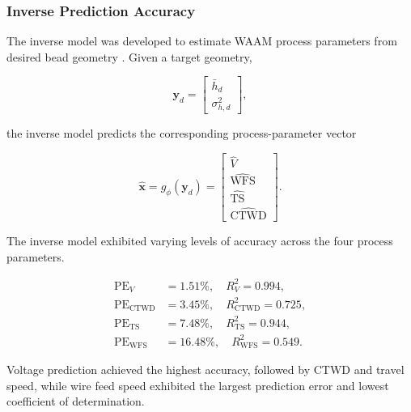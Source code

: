 \documentclass[11pt]{article}
\begin{document}
\subsubsection{Inverse Prediction Accuracy}

The inverse model was developed to estimate WAAM process parameters from desired bead geometry \cite{Karmuhilan2018,Xiong2014}. Given a target geometry,

\begin{equation}
\mathbf{y}_{d} =
\begin{bmatrix}
\bar{h}_{d} \\
\sigma_{h,d}^{2}
\end{bmatrix},
\end{equation}

the inverse model predicts the corresponding process-parameter vector

\begin{equation}
\hat{\mathbf{x}} =
g_{\phi}(\mathbf{y}_{d}) =
\begin{bmatrix}
\hat{V} \\
\widehat{\mathrm{WFS}} \\
\widehat{\mathrm{TS}} \\
\widehat{\mathrm{CTWD}}
\end{bmatrix}.
\end{equation}

The inverse model exhibited varying levels of accuracy across the four process parameters.

\begin{tcolorbox}[colback=white,colframe=black,boxrule=0.5pt,arc=2pt]
\small
\begin{equation}
\begin{aligned}
\mathrm{PE}_{V} &= 1.51\%, \quad R_{V}^{2} = 0.994, \\
\mathrm{PE}_{\mathrm{CTWD}} &= 3.45\%, \quad R_{\mathrm{CTWD}}^{2} = 0.725, \\
\mathrm{PE}_{\mathrm{TS}} &= 7.48\%, \quad R_{\mathrm{TS}}^{2} = 0.944, \\
\mathrm{PE}_{\mathrm{WFS}} &= 16.48\%, \quad R_{\mathrm{WFS}}^{2} = 0.549.
\end{aligned}
\end{equation}
\end{tcolorbox}

Voltage prediction achieved the highest accuracy, followed by CTWD and travel speed, while wire feed speed exhibited the largest prediction error and lowest coefficient of determination. 
\end{document}
